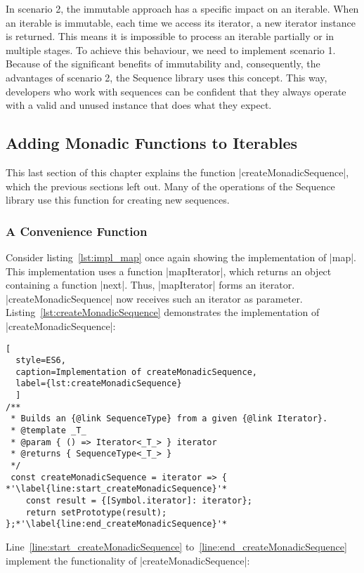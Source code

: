 In scenario 2, the immutable approach has a specific impact on an iterable.
When an iterable is immutable, each time we access its iterator, a new iterator
instance is returned.
This means it is impossible to process an iterable partially or in multiple stages.
To achieve this behaviour, we need to implement scenario 1.
\\
Because of the significant benefits of immutability and, consequently, the
advantages of scenario 2, the Sequence library uses this concept. This way,
developers who work with sequences can be confident that they always operate
with a valid and unused instance that does what they expect.

\subsection{Adding Monadic Functions to Iterables}
\label{sub:Adding Monadic Functions to Iterables}
This last section of this chapter explains the function
|createMonadicSequence|, which the previous sections left out. Many of the
operations of the Sequence library use this function for creating new
sequences.

\subsubsection{A Convenience Function}
\label{subsub:A Convenience Function}
Consider listing~\ref{lst:impl_map} once again showing the implementation of
|map|. This implementation uses a function |mapIterator|, which returns an
object containing a function |next|. Thus, |mapIterator| forms an iterator.
|createMonadicSequence| now receives such an iterator as parameter.
Listing~\ref{lst:createMonadicSequence} demonstrates the implementation of
|createMonadicSequence|:

\begin{lstlisting}[
  style=ES6, 
  caption=Implementation of createMonadicSequence,
  label={lst:createMonadicSequence}
  ]
/**
 * Builds an {@link SequenceType} from a given {@link Iterator}.
 * @template _T_
 * @param { () => Iterator<_T_> } iterator
 * @returns { SequenceType<_T_> }
 */
 const createMonadicSequence = iterator => { *'\label{line:start_createMonadicSequence}'*
    const result = {[Symbol.iterator]: iterator};
    return setPrototype(result);
};*'\label{line:end_createMonadicSequence}'*
\end{lstlisting}

Line~\ref{line:start_createMonadicSequence}
to~\ref{line:end_createMonadicSequence} implement the functionality of
|createMonadicSequence|:

